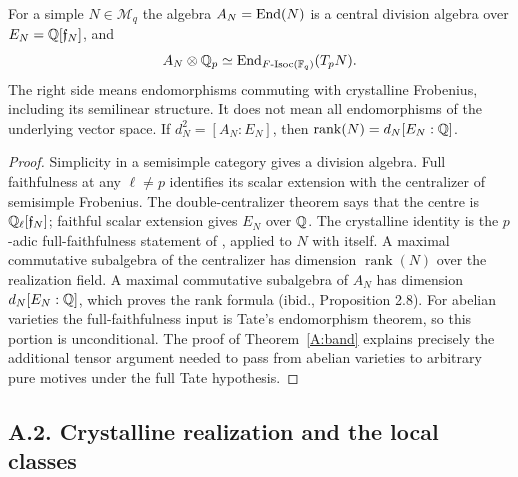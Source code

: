 \begin{proposition}
\label{A:endomorphisms}
For a simple $N\in\mathcal M_q$ the algebra $A_N=\operatorname{End}(N)$ is a
central division algebra over $E_N=\mathbb Q[\mathfrak f_N]$, and
\[
 A_N\otimes\mathbb Q_p\simeq
 \operatorname{End}_{F\text{-}\mathrm{Isoc}(\mathbb F_q)}(T_pN).
\]
The right side means endomorphisms commuting with crystalline
Frobenius, including its semilinear structure. It does not mean all
endomorphisms of the underlying vector space. If $d_N^2=[A_N:E_N]$,
then $\operatorname{rank}(N)=d_N[E_N:\mathbb Q]$.
\end{proposition}
\begin{proof}
Simplicity in a semisimple category gives a division algebra.
Full faithfulness at any $\ell\ne p$ identifies its scalar extension
with the centralizer of semisimple Frobenius. The double-centralizer
theorem says that the centre is $\mathbb Q_\ell[\mathfrak f_N]$;
faithful scalar extension gives $E_N$ over $\mathbb Q$. The crystalline
identity is the $p$-adic full-faithfulness statement of
\citet[Proposition 1.17]{AMilne1994}, applied to $N$ with itself.
A maximal commutative subalgebra of the centralizer has dimension
$\operatorname{rank}(N)$ over the realization field. A maximal
commutative subalgebra of $A_N$ has dimension $d_N[E_N:\mathbb Q]$,
which proves the rank formula (ibid., Proposition 2.8).
For abelian varieties the full-faithfulness input is Tate's
endomorphism theorem, so this portion is unconditional. The proof
of Theorem~\ref{A:band} explains precisely the additional tensor
argument needed to pass from abelian varieties to arbitrary pure
motives under the full Tate hypothesis.
\end{proof}

\subsection{A.2. Crystalline realization and the local classes}

